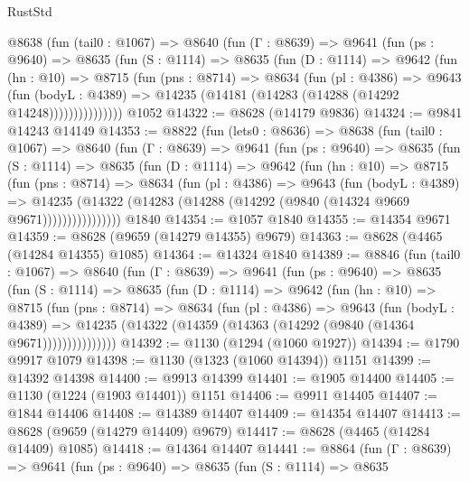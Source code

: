 \begin{lexlean}{RustStd}
\begin{coremodule}
      @8638
        (fun (tail0 : @1067) =>
        @8640
          (fun (Γ : @8639) =>
          @9641
            (fun (ps : @9640) =>
            @8635
              (fun (S : @1114) =>
              @8635
                (fun (D : @1114) =>
                @9642
                  (fun (hn : @10) =>
                  @8715
                    (fun (pns : @8714) =>
                    @8634
                      (fun (pl : @4386) =>
                      @9643
                        (fun (bodyL : @4389) =>
                        @14235 (@14181 (@14283 (@14288 (@14292 @14248)))))))))))))))
    @1052
@14322 := @8628 (@14179 @9836)
@14324 := @9841 @14243 @14149
@14353 := @8822
    (fun (lets0 : @8636) =>
    @8638
      (fun (tail0 : @1067) =>
      @8640
        (fun (Γ : @8639) =>
        @9641
          (fun (ps : @9640) =>
          @8635
            (fun (S : @1114) =>
            @8635
              (fun (D : @1114) =>
              @9642
                (fun (hn : @10) =>
                @8715
                  (fun (pns : @8714) =>
                  @8634
                    (fun (pl : @4386) =>
                    @9643
                      (fun (bodyL : @4389) =>
                      @14235
                        (@14322 (@14283 (@14288 (@14292 (@9840 (@14324 @9669 @9671))))))))))))))))
    @1840
@14354 := @1057 @1840
@14355 := @14354 @9671
@14359 := @8628 (@9659 (@14279 @14355) @9679)
@14363 := @8628 (@4465 (@14284 @14355) @1085)
@14364 := @14324 @1840
@14389 := @8846
    (fun (tail0 : @1067) =>
    @8640
      (fun (Γ : @8639) =>
      @9641
        (fun (ps : @9640) =>
        @8635
          (fun (S : @1114) =>
          @8635
            (fun (D : @1114) =>
            @9642
              (fun (hn : @10) =>
              @8715
                (fun (pns : @8714) =>
                @8634
                  (fun (pl : @4386) =>
                  @9643
                    (fun (bodyL : @4389) =>
                    @14235 (@14322 (@14359 (@14363 (@14292 (@9840 (@14364 @9671)))))))))))))))
@14392 := @1130 (@1294 (@1060 @1927))
@14394 := @1790 @9917 @1079
@14398 := @1130 (@1323 (@1060 @14394)) @1151
@14399 := @14392 @14398
@14400 := @9913 @14399
@14401 := @1905 @14400
@14405 := @1130 (@1224 (@1903 @14401)) @1151
@14406 := @9911 @14405
@14407 := @1844 @14406
@14408 := @14389 @14407
@14409 := @14354 @14407
@14413 := @8628 (@9659 (@14279 @14409) @9679)
@14417 := @8628 (@4465 (@14284 @14409) @1085)
@14418 := @14364 @14407
@14441 := @8864
    (fun (Γ : @8639) =>
    @9641
      (fun (ps : @9640) =>
      @8635
        (fun (S : @1114) =>
        @8635

\end{coremodule}
\end{lexlean}
